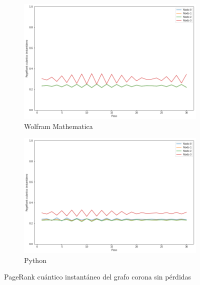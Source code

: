 \begin{figure}[H]
    \centering
    \begin{subfigure}[m]{0.45\textwidth}
        \centering
        \includegraphics[width=0.9\linewidth]{img/crown-inst-M.png}
        \caption{Wolfram Mathematica}
    \end{subfigure}
    \begin{subfigure}[m]{0.45\textwidth}
        \centering
        \includegraphics[width=0.9\linewidth]{img/crown-inst-lossless.png}
        \caption{Python}
    \end{subfigure}
    \caption[PageRank cuántico instantáneo del grafo corona sin pérdidas]{PageRank cuántico instantáneo del grafo corona sin pérdidas}
    \label{fig:instcrownlossless}
\end{figure}

